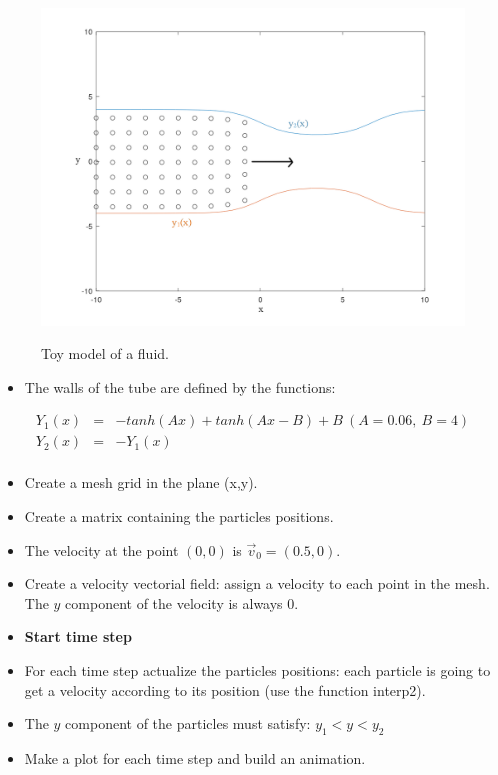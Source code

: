 \documentclass[12pt]{article}
\begin{document}
\begin{figure}[h!]
  \begin{center}
    \includegraphics[height=3.6in]{images/fluid_sim.png}
    \caption{Toy model of a fluid. }
    \label{2}
  \end{center}
\end{figure}



\begin{itemize}
  \item The walls of the tube are defined by the functions: 

\end{itemize}


\begin{eqnarray*}
  Y_1(x)&=&-tanh(Ax)+tanh(Ax-B)+B~  (A=0.06,~B=4)\\
  Y_2(x)&=&-Y_1(x)\\
\end{eqnarray*}



\begin{itemize}

  \item Create a mesh grid in the plane (x,y).
  \item Create a matrix containing the particles positions.
  \item The velocity at the point $(0,0)$ is $\vec{v}_0=(0.5,0)$.
  \item Create a velocity vectorial field: assign a velocity to each point in the mesh. The $y$ component of the velocity is always $0$.
  \item \textbf{Start time step}
  \item For each time step actualize the particles positions: each particle is going 
  to get a velocity according to its position (use the function interp2). 
  \item The $y$ component of the particles must satisfy: $y_1<y<y_2$
  \item Make a plot for each time step and build an animation.
\end{itemize}
\end{document}
